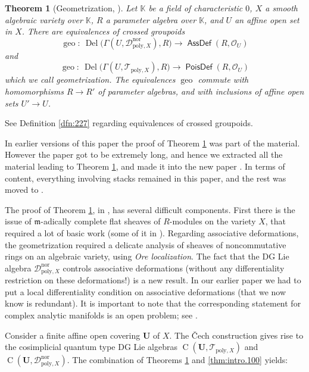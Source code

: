 \documentclass[a4paper, 10pt]{amsart}
\newtheorem{thm}[equation]{Theorem}
\theoremstyle{definition}
\numberwithin{equation}{section}
\newcommand{\opn}{\operatorname}
\newcommand{\cat}[1]{\operatorname{\mathsf{#1}}}
\newcommand{\mfrak}[1]{\mathfrak{#1}}
\newcommand{\mcal}[1]{\mathcal{#1}}
\newcommand{\mrm}[1]{\mathrm{#1}}
\newcommand{\mbb}[1]{\mathbb{#1}}
\newcommand{\bsym}[1]{\boldsymbol{#1}}
\newcommand{\K}{\mbb{K}}
\newcommand{\m}{\mfrak{m}}
\begin{document}
\begin{thm}[{Geometrization, \cite[Theorem 0.1]{Ye9}}] \label{thm:120}
Let $\K$ be a field of characteristic $0$, $X$ a smooth algebraic variety
over $\K$, $R$ a parameter algebra over $\K$, 
and $U$ an affine open set in $X$.
There are equivalences of crossed groupoids
\[  \opn{geo} : \
\opn{Del} \bigl( \Gamma(U, \mcal{D}_{\mrm{poly}, X}^{\mrm{nor}}) , R \big)
\to \cat{AssDef}(R, \mcal{O}_U) \]
and
\[  \opn{geo} : \
\opn{Del} \bigl( \Gamma(U, \mcal{T}_{\mrm{poly}, X}) , R \big)
\to \cat{PoisDef}(R, \mcal{O}_U) \]
which we call {\em geometrization}. The equivalences  $\opn{geo}$
commute with homomorphisms $R \to R'$ of parameter algebras, and with inclusions
of affine open sets $U' \to U$.
\end{thm}

See Definition \ref{dfn:227} regarding equivalences of crossed groupoids.

In earlier versions of this paper the proof of Theorem \ref{thm:120} was
part of the material. However the paper got to be extremely long, and
hence we extracted all the material leading to Theorem
\ref{thm:120}, and made it into the new paper \cite{Ye9}. 
In terms of content, everything involving stacks remained in this paper, and
the rest was moved to \cite{Ye9}. 

The proof of Theorem \ref{thm:120}, in \cite{Ye9}, has several difficult
components. First there is the issue of $\m$-adically complete flat sheaves of
$R$-modules on the variety $X$, that required a lot of basic work 
(some of it in \cite{Ye5}). Regarding associative deformations, the
geometrization required a delicate analysis of sheaves of noncommutative rings 
on an algebraic variety, using {\em Ore localization}. The fact that the DG Lie
algebra $\mcal{D}_{\mrm{poly}, X}^{\mrm{nor}}$ controls  associative
deformations (without any differentiality restriction on these deformations!) 
is a new result. In our earlier paper \cite{Ye1} we had to put a local
differentiality condition on associative deformations (that we now know is
redundant). It is important to note that the corresponding statement 
for complex analytic manifolds is an open problem; see \cite[Remark 2.2.7]{KS2}.

Consider a finite affine open covering $\bsym{U}$ of $X$. The \v{C}ech
construction gives rise to the  cosimplicial quantum type DG Lie algebras
$\opn{C}(\bsym{U}, \mcal{T}_{\mrm{poly}, X})$ and 
$\opn{C}(\bsym{U}, \mcal{D}_{\mrm{poly}, X}^{\mrm{nor}})$. 
The combination of Theorems \ref{thm:120} and \ref{thm:intro.100} yields:
\end{document}
